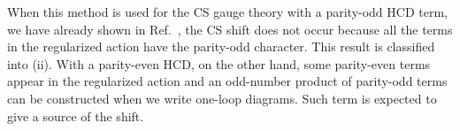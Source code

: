 \documentclass[a4paper,12pt]{article}
\begin{document}
When this method is used for the CS gauge theory with a parity-odd HCD term,
we have already shown in Ref.~\cite{Nittoh:1998ey},
the CS shift does not occur
because all the terms in the regularized action
have the parity-odd character.
%
This result is classified into (ii).
%
With a parity-even HCD, on the other hand,
some parity-even terms appear in the regularized action
and an odd-number product of parity-odd terms
can be constructed when we write one-loop diagrams.
%
Such term is expected to give a source of the shift.









\label{sec:YMCS}
\end{document}
